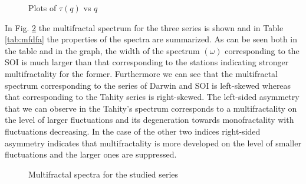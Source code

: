 \documentclass[onecolumn, preprint,aps,amsmath, amssymb, superscriptaddress]{revtex4}
\begin{document}
\begin{figure}
\caption{Plots of $\tau(q)$ vs $q$}
\label{fig:tau}
\end{figure}

In Fig. \ref{fig:spectrum} the multifractal spectrum for the three series is shown and in Table \ref{tab:mfdfa} the properties of the spectra are summarized. As can be seen both in the table and in the graph, the width of the spectrum $(\omega)$ corresponding to the SOI is much larger than that corresponding to the stations indicating stronger multifractality for the former. Furthermore we can see that the multifractal spectrum corresponding to the series of Darwin and SOI is left-skewed whereas that corresponding to the Tahity series is right-skewed. The left-sided asymmetry that we can observe in the Tahity's spectrum corresponds to a  multifractality on the level of larger fluctuations and its degeneration towards monofractality with fluctuations decreasing. In the case of the other two indices right-sided asymmetry indicates that multifractality is more developed on the level of smaller fluctuations and the larger ones are suppressed.


\begin{figure}
\caption{Multifractal spectra for the studied series}
\label{fig:spectrum}
\end{figure}
\end{document}
